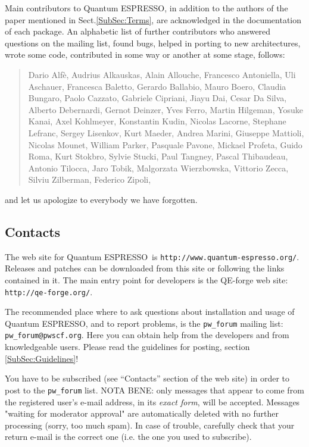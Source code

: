 \documentclass[12pt,a4paper]{article}
\def\qe{{\sc Quantum ESPRESSO}}
\begin{document}
Main contributors to \qe, in addition to the authors of the paper 
mentioned in Sect.\ref{SubSec:Terms}, are acknowledged in the 
documentation of each package. An alphabetic list of further
contributors who answered questions on the mailing list, found 
bugs, helped in porting to new architectures, wrote some code,
contributed in some way or another at some stage, follows:
\begin{quote}
  Dario Alf\`e, Audrius Alkauskas, Alain Allouche, Francesco Antoniella,
  Uli Aschauer,  Francesca Baletto, Gerardo Ballabio, Mauro Boero, 
  Claudia Bungaro, Paolo Cazzato, Gabriele Cipriani, Jiayu Dai,
  Cesar Da Silva, Alberto Debernardi, Gernot Deinzer, Yves Ferro,
  Martin Hilgeman, Yosuke Kanai, Axel Kohlmeyer, Konstantin Kudin,
  Nicolas Lacorne, Stephane Lefranc, Sergey Lisenkov, Kurt Maeder,
  Andrea Marini, Giuseppe Mattioli, Nicolas Mounet, William Parker,
  Pasquale Pavone, Mickael Profeta, Guido Roma, Kurt Stokbro, 
  Sylvie Stucki, Paul Tangney,  Pascal Thibaudeau, Antonio Tilocca,
  Jaro Tobik, Malgorzata Wierzbowska, Vittorio Zecca,
  Silviu Zilberman, Federico Zipoli,
\end{quote}
and let us apologize to everybody we have forgotten.
 
\subsection{Contacts}
\label{SubSec:Contacts}

The web site for \qe\ is \texttt{http://www.quantum-espresso.org/}.
Releases and patches can be downloaded from this
site or following the links contained in it. The main entry point for 
developers is the QE-forge web site:
\texttt{http://qe-forge.org/}.

The recommended place where to ask questions about installation 
and usage of \qe, and to report problems, is the \texttt{pw\_forum} 
mailing list: \texttt{pw\_forum@pwscf.org}. 
Here you can obtain help from the developers and from 
knowledgeable users. Please read the guidelines for posting,
section \ref{SubSec:Guidelines}!

You have to be subscribed (see ``Contacts'' section of the web site)
in order to post to the  \texttt{pw\_forum} list. 
NOTA BENE: only messages that appear to come from the 
registered user's e-mail address, in its {\em exact form}, will be
accepted. Messages "waiting for moderator approval" are
automatically deleted with no further processing (sorry, too 
much spam). In case of trouble, carefully check that your return 
e-mail is the correct one (i.e. the one you used to subscribe).
\end{document}
